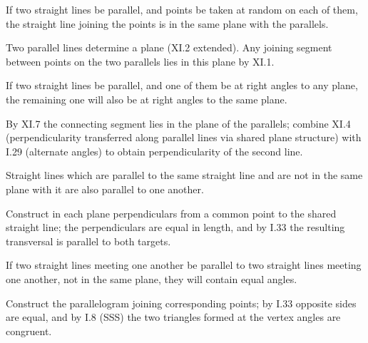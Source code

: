 \documentclass{rrxiv}
\begin{document}
\begin{claim}
\label{prop:XI.7}
If two straight lines be parallel, and points be taken at random on
each of them, the straight line joining the points is in the same
plane with the parallels.
\end{claim}
\begin{evidence}[Proof of XI.7]
\label{ev:XI.7}
Two parallel lines determine a plane (XI.2 extended).  Any joining
segment between points on the two parallels lies in this plane by
XI.1.
\end{evidence}

\begin{claim}
\label{prop:XI.8}
If two straight lines be parallel, and one of them be at right angles
to any plane, the remaining one will also be at right angles to the
same plane.
\end{claim}
\begin{evidence}[Proof of XI.8]
\label{ev:XI.8}
By XI.7 the connecting segment lies in the plane of the parallels;
combine XI.4 (perpendicularity transferred along parallel lines via
shared plane structure) with I.29 (alternate angles) to obtain
perpendicularity of the second line.
\end{evidence}

\begin{claim}
\label{prop:XI.9}
Straight lines which are parallel to the same straight line and are
not in the same plane with it are also parallel to one another.
\end{claim}
\begin{evidence}[Proof of XI.9]
\label{ev:XI.9}
Construct in each plane perpendiculars from a common point to the
shared straight line; the perpendiculars are equal in length, and
by I.33 the resulting transversal is parallel to both targets.
\end{evidence}

\begin{claim}
\label{prop:XI.10}
If two straight lines meeting one another be parallel to two straight
lines meeting one another, not in the same plane, they will contain
equal angles.
\end{claim}
\begin{evidence}[Proof of XI.10]
\label{ev:XI.10}
Construct the parallelogram joining corresponding points; by I.33
opposite sides are equal, and by I.8 (SSS) the two triangles formed
at the vertex angles are congruent.
\end{evidence}
\end{document}
